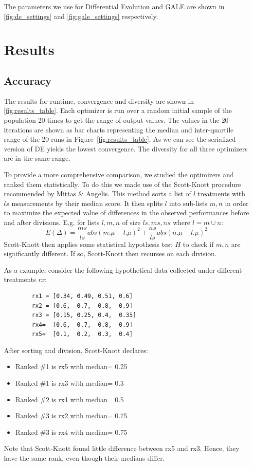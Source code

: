 \documentclass[conference]{IEEEtran}
\newcommand{\bi}{\begin{itemize}}
\newcommand{\ei}{\end{itemize}}
\newcommand{\fig}[1]{Figure~\ref{fig:#1}}
\begin{document}
	The parameters we use for Differential Evolution and GALE are shown in \ref{fig:de_settings} and \ref{fig:gale_settings} respectively.
	
	\section{Results}
	\label{results}
	
	\subsection{Accuracy}
	The results for runtime, convergence and diversity are shown in \ref{fig:results_table}. Each optimizer is run over a random initial sample of the population 20 times to get the range of output values. The values in the 20 iterations are shown as bar charts representing the median and inter-quartile range of the 20 runs in \fig{results_table}.  As we can see the serialized version of DE yields the lowest convergence. The diversity for all three optimizers are in the same range.
	
	
	To provide a more comprehensive comparison, we studied the optimizers and ranked them statistically. To do this we made use of the Scott-Knott procedure recommended by Mittas \& Angelis\cite{mittas13}. This method
	sorts a list of $l$ treatments with $ls$ measurements by their median
	score. It then
	splits $l$ into sub-lists $m,n$ in order to maximize the expected value of
	differences  in the observed performances
	before and after divisions. E.g. for lists $l,m,n$ of size $ls,ms,ns$ where $l=m\cup n$:
	\[E(\Delta)=\frac{ms}{ls}abs(m.\mu - l.\mu)^2 + \frac{ns}{ls}abs(n.\mu - l.\mu)^2\]
	Scott-Knott then applies some statistical hypothesis test $H$ to check
	if $m,n$ are significantly different. If so, Scott-Knott then recurses on each division.
	
	As a example, consider the following hypothetical data collected under different treatments {\em rx}:
	
	{\scriptsize \begin{verbatim}
		rx1 = [0.34, 0.49, 0.51, 0.6]
		rx2 = [0.6,  0.7,  0.8,  0.9]
		rx3 = [0.15, 0.25, 0.4,  0.35]
		rx4=  [0.6,  0.7,  0.8,  0.9]
		rx5=  [0.1,  0.2,  0.3,  0.4]
		\end{verbatim}}
	\noindent
	After sorting and division, Scott-Knott declares:
	\bi
	\item Ranked \#1 is rx5 with median= 0.25
	\item Ranked \#1 is rx3 with median= 0.3
	\item Ranked \#2 is rx1 with median= 0.5
	\item Ranked \#3 is rx2 with median= 0.75
	\item Ranked \#3 is rx4 with median= 0.75
	\ei
	Note that Scott-Knott found  little
	difference between rx5 and rx3. Hence,
	they have the same rank, even though their medians differ.
	
\end{document}
